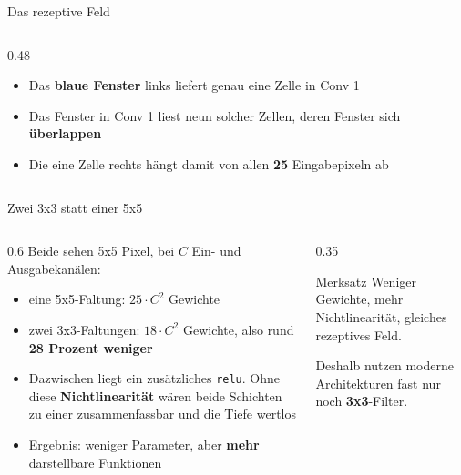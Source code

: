 \begin{frame}{Das rezeptive Feld}
\begin{columns}[T]
\begin{column}{0.48\linewidth}
\begin{center}
{}
\end{center}
\begin{itemize}
  \item Das \textbf{blaue Fenster} links liefert genau eine Zelle in Conv 1
  \item Das Fenster in Conv 1 liest neun solcher Zellen, deren Fenster sich \textbf{überlappen}
  \item Die eine Zelle rechts hängt damit von allen \textbf{25} Eingabepixeln ab
\end{itemize}
\end{column}
\end{columns}
\end{frame}

\begin{frame}{Zwei 3x3 statt einer 5x5}
\begin{columns}
\begin{column}{0.6\linewidth}
Beide sehen 5x5 Pixel, bei $C$ Ein- und Ausgabekanälen:
\begin{itemize}
  \item eine 5x5-Faltung: $25 \cdot C^2$ Gewichte
  \item zwei 3x3-Faltungen: $18 \cdot C^2$ Gewichte, also rund \textbf{28 Prozent weniger}
  \item Dazwischen liegt ein zusätzliches \texttt{relu}. Ohne diese \textbf{Nichtlinearität} wären beide Schichten zu einer zusammenfassbar und die Tiefe wertlos
  \item Ergebnis: weniger Parameter, aber \textbf{mehr} darstellbare Funktionen
\end{itemize}
\end{column}
\begin{column}{0.35\linewidth}
\begin{block}{Merksatz}
Weniger Gewichte, mehr Nichtlinearität, gleiches rezeptives Feld.
\end{block}
Deshalb nutzen moderne Architekturen fast nur noch \textbf{3x3}-Filter.
\end{column}
\end{columns}
\end{frame}


